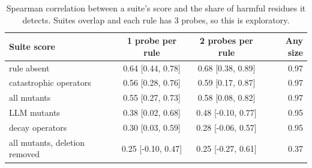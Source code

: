 \begin{table}[t]
\centering\small\setlength{\tabcolsep}{4pt}
\caption{Spearman correlation between a suite's score and the share of harmful residues it detects. Suites overlap and each rule has 3 probes, so this is exploratory.}\label{tab:suites}
\begin{tabular}{lccr}
\toprule
Suite score & 1 probe per rule & 2 probes per rule & Any size \\
\midrule
rule absent & 0.64 [0.44, 0.78] & 0.68 [0.38, 0.89] & 0.97 \\
catastrophic operators & 0.56 [0.28, 0.76] & 0.59 [0.17, 0.87] & 0.97 \\
all mutants & 0.55 [0.27, 0.73] & 0.58 [0.08, 0.82] & 0.97 \\
LLM mutants & 0.38 [0.02, 0.68] & 0.48 [-0.10, 0.77] & 0.95 \\
decay operators & 0.30 [0.03, 0.59] & 0.28 [-0.06, 0.57] & 0.95 \\
all mutants, deletion removed & 0.25 [-0.10, 0.47] & 0.25 [-0.27, 0.61] & 0.37 \\
\bottomrule
\end{tabular}
\end{table}
